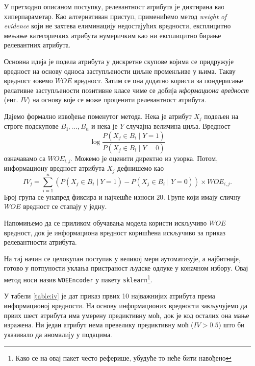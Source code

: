\documentclass[12pt, a4paper]{article}
\begin{document}
	У претходно описаном поступку, релевантност атрибута је диктирана као хиперпараметар. Као алтернативан приступ, применићемо метод \textit{weight of evidence} који не захтева елиминацију недостајућих вредности, експлицитно мењање категоричких атрибута нумеричким као ни експлицитно бирање релевантних атрибута.
	
	Основна идеја је подела атрибута у дискретне скупове којима се придружује вредност на основу односа заступљености циљне променљиве у њима. Такву вредност зовемо $WOE$ вредност. Затим се она додатно користи за пондерисање релативне заступљености позитивне класе чиме се добија \textit{нформациона вредност} (енг. $IV$) на основу које се може проценити релевантност атрибута.
	
	Дајемо формално извођење поменутог метода. Нека је атрибут $X_j$ подељен на строге подскупове $B_1, ..., B_n$ и нека је $Y$ случајна величина циља. Вредност $$\log\frac{P(X_j \in B_i \mid Y=1)}{P(X_j \in B_i \mid Y=0)}$$ означавамо са $WOE_{i,j}$. Можемо је оценити директно из узорка. Потом, информациону вредност атрибута $X_j$ дефнишемо као $$IV_j = \sum_{i=1}^{n}(P(X_j \in B_i \mid Y=1) - P(X_j \in B_i \mid Y=0)) \times WOE_{i,j}.$$ Број група се унапред фиксира и најчешће износи $20$. Групе који имају сличну $WOE$ вредност се стапају у једну.
	
	Напомињемо да се приликом обучавања модела користи искључиво $WOE$ вредност, док је информациона вредност коришћена искључиво за приказ релевантности атрибута.
	
	На тај начин се целокупан поступак у великој мери аутоматизује, а најбитније, готово у потпуности уклања пристраност људске одлуке у коначном избору. Овај метод носи назив \texttt{WOEEncoder} у пакету \texttt{sklearn}\footnote{Како се на овај пакет често реферише, убудуће то неће бити навођено}.

	У табели \ref{table:iv} је дат приказ првих 10 најважнијих атрибута према информационој вредности. На основу информационих вредности закључујемо да првих шест атрибута има умерену предиктивну моћ, док је код осталих она мање изражена. Ни један атрибут нема превелику предиктивну моћ ($IV > 0.5$) што би указивало да аномалију у подацима.
	
\end{document}

